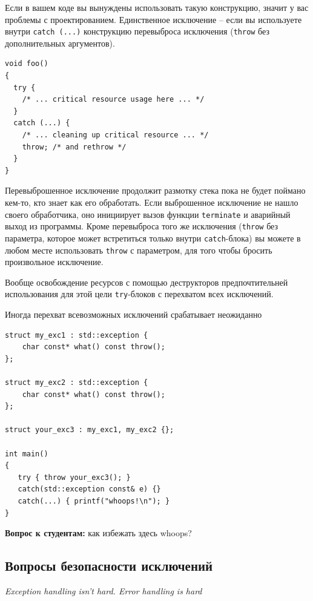 \documentclass[a4paper,12pt,oneside]{article}
\newif\ifanswers
\begin{document}
Если в вашем коде вы вынуждены использовать такую конструкцию, значит у вас проблемы с проектированием. Единственное исключение -- если вы используете внутри \lstinline!catch (...)! конструкцию перевыброса исключения (\lstinline!throw! без дополнительных аргументов).

\begin{lstlisting}
void foo()
{
  try {
    /* ... critical resource usage here ... */
  }
  catch (...) {
    /* ... cleaning up critical resource ... */
    throw; /* and rethrow */
  }
}
\end{lstlisting}

Перевыброшенное исключение продолжит размотку стека пока не будет поймано кем-то, кто знает как его обработать. Если выброшенное исключение не нашло своего обработчика, оно инициирует вызов функции \lstinline!terminate! и аварийный выход из программы. Кроме перевыброса того же исключения (\lstinline!throw! без параметра, которое может встретиться только внутри \lstinline!catch!-блока) вы можете в любом месте использовать \lstinline!throw! с параметром, для того чтобы бросить произвольное исключение. 

Вообще освобождение ресурсов с помощью деструкторов предпочтительней использования для этой цели \lstinline!try!-блоков с перехватом всех исключений.

Иногда перехват всевозможных исключений срабатывает неожиданно

\begin{lstlisting}
struct my_exc1 : std::exception { 
    char const* what() const throw(); 
};

struct my_exc2 : std::exception { 
    char const* what() const throw(); 
};

struct your_exc3 : my_exc1, my_exc2 {};

int main()
{
   try { throw your_exc3(); }
   catch(std::exception const& e) {}
   catch(...) { printf("whoops!\n"); }
}
\end{lstlisting}

\textbf{Вопрос к студентам:} как избежать здесь whoops?

\ifanswers
Правильный ответ: виртуальное наследование.
\fi

\pagebreak
\subsection{Вопросы безопасности исключений}\label{ExceptionSafety}

\hfill\textit{Exception handling isn't hard. Error handling is hard}{\vspace{0.5em}}
\end{document}
